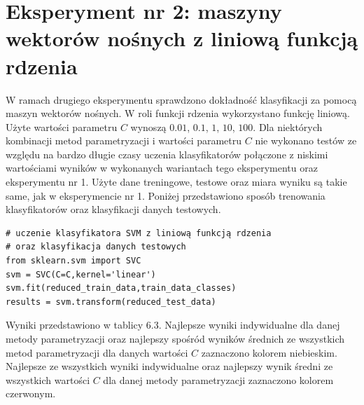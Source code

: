 \documentclass[notitlepage]{report}
\begin{document}
\section{Eksperyment nr 2: maszyny wektorów nośnych z liniową funkcją rdzenia}
W ramach drugiego eksperymentu sprawdzono dokładność klasyfikacji za pomocą maszyn wektorów nośnych. W roli funkcji rdzenia wykorzystano funkcję liniową. Użyte wartości parametru $C$ wynoszą $0.01$, $0.1$, $1$, $10$, $100$. Dla niektórych kombinacji metod parametryzacji i wartości parametru $C$ nie wykonano testów ze względu na bardzo długie czasy uczenia klasyfikatorów połączone z niskimi wartościami wyników w wykonanych wariantach tego eksperymentu oraz eksperymentu nr 1. Użyte dane treningowe, testowe oraz miara wyniku są takie same, jak w eksperymencie nr 1. Poniżej przedstawiono sposób trenowania klasyfikatorów oraz klasyfikacji danych testowych.

\begin{lstlisting}
# uczenie klasyfikatora SVM z liniową funkcją rdzenia
# oraz klasyfikacja danych testowych
from sklearn.svm import SVC
svm = SVC(C=C,kernel='linear')
svm.fit(reduced_train_data,train_data_classes)
results = svm.transform(reduced_test_data)
\end{lstlisting}

Wyniki przedstawiono w tablicy 6.3. Najlepsze wyniki indywidualne dla danej metody parametryzacji oraz najlepszy spośród wyników średnich ze wszystkich metod parametryzacji dla danych wartości $C$ zaznaczono kolorem niebieskim. Najlepsze ze wszystkich wyniki indywidualne oraz najlepszy wynik średni ze wszystkich wartości $C$ dla danej metody parametryzacji zaznaczono kolorem czerwonym.
\end{document}
